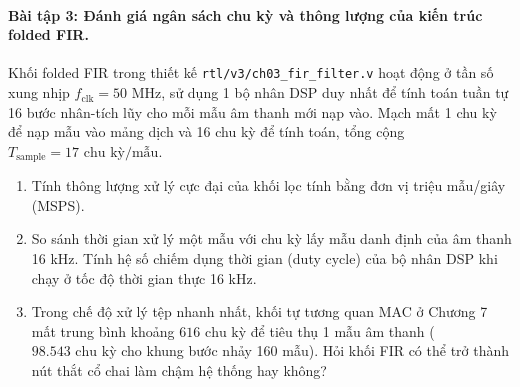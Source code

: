 \paragraph{Bài tập 3: Đánh giá ngân sách chu kỳ và thông lượng của kiến trúc folded FIR.}
Khối folded FIR trong thiết kế \texttt{rtl/v3/ch03\_fir\_filter.v} hoạt động ở tần số xung nhịp $f_{\text{clk}} = 50\text{ MHz}$, sử dụng 1 bộ nhân DSP duy nhất để tính toán tuần tự 16 bước nhân-tích lũy cho mỗi mẫu âm thanh mới nạp vào. Mạch mất 1 chu kỳ để nạp mẫu vào mảng dịch và 16 chu kỳ để tính toán, tổng cộng $T_{\text{sample}} = 17\text{ chu kỳ/mẫu}$.
\begin{enumerate}[label=(\alph*)]
    \item Tính thông lượng xử lý cực đại của khối lọc tính bằng đơn vị triệu mẫu/giây (MSPS).
    \item So sánh thời gian xử lý một mẫu với chu kỳ lấy mẫu danh định của âm thanh 16 kHz. Tính hệ số chiếm dụng thời gian (duty cycle) của bộ nhân DSP khi chạy ở tốc độ thời gian thực 16 kHz.
    \item Trong chế độ xử lý tệp nhanh nhất, khối tự tương quan MAC ở Chương 7 mất trung bình khoảng $616\text{ chu kỳ}$ để tiêu thụ 1 mẫu âm thanh ($98.543\text{ chu kỳ}$ cho khung bước nhảy 160 mẫu). Hỏi khối FIR có thể trở thành nút thắt cổ chai làm chậm hệ thống hay không?
\end{enumerate}


